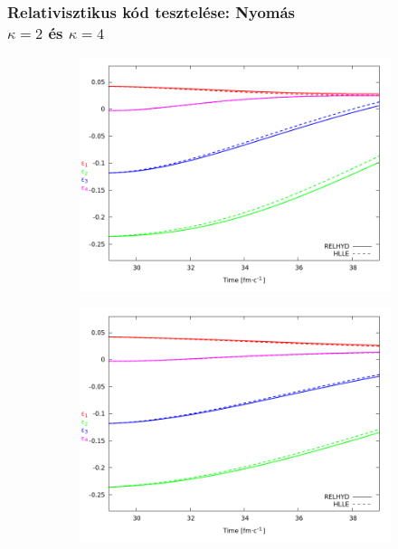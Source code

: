 \documentclass{beamer}
\begin{document}
\begin{frame}[noframenumbering]
\frametitle{Relativisztikus kód tesztelése: Nyomás \\ $\kappa=2$ és $\kappa=4$}
\begin{center}
\begin{figure}[H]
	\centering
    \begin{subfigure}[b]{0.49\textwidth}
    		\includegraphics[width=\textwidth]{pic/res/hr_p_kappa=2}
	\end{subfigure}
	\begin{subfigure}[b]{0.49\textwidth}
        	\includegraphics[width=\textwidth]{pic/res/hr_p_kappa=4}
	\end{subfigure}
\end{figure}
\end{center}
\end{frame}
\end{document}
